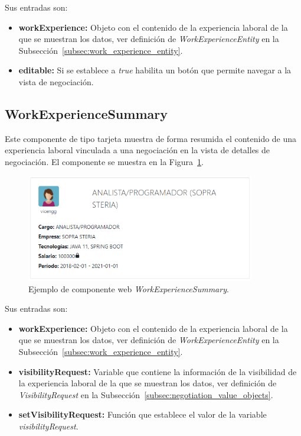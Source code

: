 \documentclass[a4paper, 12pt]{book}
\begin{document}
    Sus entradas son:
    \begin{itemize}
        \item \textbf{workExperience:} Objeto con el contenido de la experiencia laboral de la que se muestran los datos, ver definición de \emph{WorkExperienceEntity} en la Subsección~\ref{subsec:work_experience_entity}.
        \item \textbf{editable:} Si se establece a \emph{true} habilita un botón que permite navegar a la vista de negociación.
    \end{itemize}

    \subsection{WorkExperienceSummary}
    \label{subsec:wc_work_experience_summary}
    Este componente de tipo tarjeta muestra de forma resumida el contenido de una experiencia laboral vinculada a una negociación en la vista de detalles de negociación.
    El componente se muestra en la Figura~\ref{fig:component_work_experience_summary}.
    \begin{figure}
        \centering
        \includegraphics[width=10cm, keepaspectratio]{img/WorkExperienceSummary.PNG}
        \caption{Ejemplo de componente web \emph{WorkExperienceSummary}.}\label{fig:component_work_experience_summary}
    \end{figure}

    Sus entradas son:

    \begin{itemize}
        \item \textbf{workExperience:} Objeto con el contenido de la experiencia laboral de la que se muestran los datos, ver definición de \emph{WorkExperienceEntity} en la Subsección~\ref{subsec:work_experience_entity}.
        \item        \textbf{visibilityRequest:} Variable que contiene la información de la visibilidad de la experiencia laboral de la que se muestran los datos, ver definición de \emph{VisibilityRequest} en la Subsección~\ref{subsec:negotiation_value_objects}.
        \item \textbf{setVisibilityRequest:} Función que establece el valor de la variable \emph{visibilityRequest}.
    \end{itemize}
\end{document}
